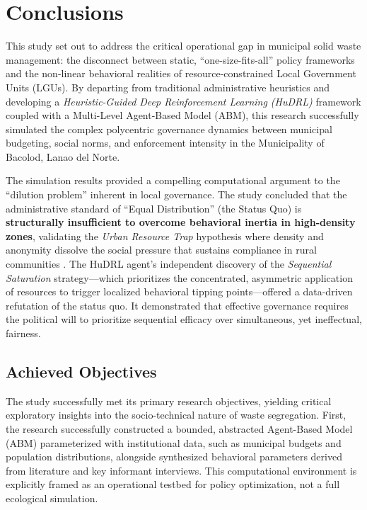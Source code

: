 
\chapter{Conclusions}

This study set out to address the critical operational gap in municipal solid waste management: the disconnect between static, ``one-size-fits-all'' policy frameworks and the non-linear behavioral realities of resource-constrained Local Government Units (LGUs). By departing from traditional administrative heuristics and developing a \textit{Heuristic-Guided Deep Reinforcement Learning (HuDRL)} framework coupled with a Multi-Level Agent-Based Model (ABM), this research successfully simulated the complex polycentric governance dynamics between municipal budgeting, social norms, and enforcement intensity in the Municipality of Bacolod, Lanao del Norte.

The simulation results provided a compelling computational argument to the ``dilution problem'' inherent in local governance. The study concluded that the administrative standard of ``Equal Distribution'' (the Status Quo) is \textbf{structurally insufficient to overcome behavioral inertia in high-density zones}, validating the \textit{Urban Resource Trap} hypothesis where density and anonymity dissolve the social pressure that sustains compliance in rural communities \citep{Villanueva2021}. The HuDRL agent's independent discovery of the \textit{Sequential Saturation} strategy—which prioritizes the concentrated, asymmetric application of resources to trigger localized behavioral tipping points—offered a data-driven refutation of the status quo. It demonstrated that effective governance requires the political will to prioritize sequential efficacy over simultaneous, yet ineffectual, fairness.

\newpage

\section{Achieved Objectives}
\setlength{\parindent}{2em}

The study successfully met its primary research objectives, yielding critical exploratory insights into the socio-technical nature of waste segregation. First, the research successfully constructed a bounded, abstracted Agent-Based Model (ABM) parameterized with institutional data, such as municipal budgets and population distributions, alongside synthesized behavioral parameters derived from literature and key informant interviews. This computational environment is explicitly framed as an operational testbed for policy optimization, not a full ecological simulation. 


